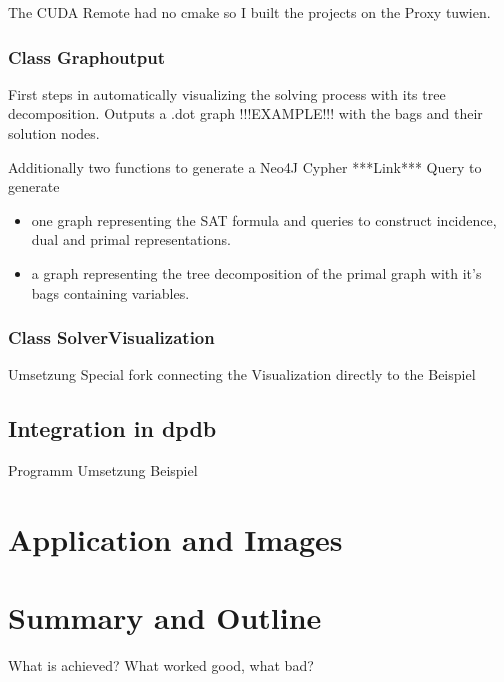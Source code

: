 \documentclass[a4paper, 12pt]{scrartcl}
\begin{document}
The CUDA Remote had no cmake so I built the projects on the Proxy tuwien.

\subsubsection{Class Graphoutput}
First steps in automatically visualizing the solving process with its tree decomposition.
Outputs a .dot graph !!!EXAMPLE!!! with the bags and their solution nodes.

Additionally two functions to generate a Neo4J Cypher ***Link*** Query to generate
\begin{itemize}
	\item one graph representing the SAT formula and  queries to construct incidence, dual and primal representations.
	\item a graph representing the tree decomposition of the primal graph with it's bags containing variables.
\end{itemize}
\subsubsection{Class SolverVisualization}

Umsetzung Special fork connecting the Visualization directly to the 
Beispiel
\newpage
\subsection{Integration in dpdb}
Programm
Umsetzung
Beispiel

\newpage
\section{Application and Images }

\newpage
\section{Summary and Outline}
What is achieved?
What worked good, what bad?
{}

\end{document}

